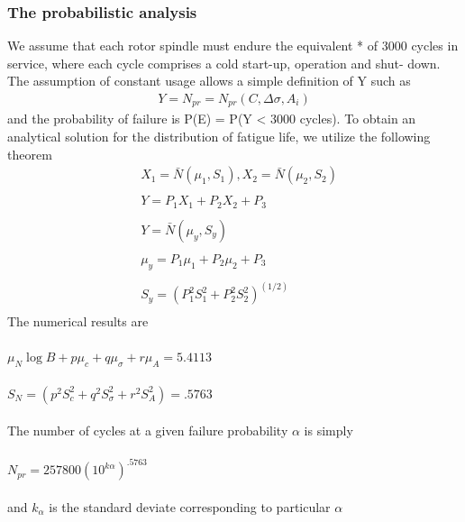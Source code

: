 \documentclass[12pt]{article}
\begin{document}
\subsubsection{The probabilistic analysis}
We assume that each rotor spindle must endure
the equivalent * of 3000 cycles in service, where each
cycle comprises a cold start-up, operation and shut-
down. The assumption of constant usage allows a
simple definition of Y such as
\begin{align*}
    Y = N_{pr} = N_{pr}(C, \Delta\sigma, A_i)
\end{align*}
and the probability of failure is P(E) = P(Y < 3000
cycles).
To obtain an analytical solution for the distribution of fatigue life, we utilize the following theorem
\begin{align*}
    &X_1 = \bar{N}(\mu_1, S_1),    X_2 = \bar{N}(\mu_2, S_2)\\
    \\&Y = P_1 X_1 + P_2 X_2 + P_3\\
    \\&Y = \bar{N}(\mu_y, S_y)\\
    \\&\mu_y = P_1 \mu_1 + P_2 \mu_2 + P_3\\
    \\&S_y = (P_1^2 S_1^2 + P_2^2 S_2^2)^{(1/2)}\\
\end{align*}
The numerical results are\\\\
$\mu_N \log B + p \mu_c + q \mu_\sigma + r\mu_A = 5.4113$\\\\
$S_N = (p^2 S_c^2 + q^2 S_\sigma^2 + r^2 S_A^2) = .5763$\\\\
The number of cycles at a given failure probability $\alpha$ is simply\\\\
$N_{pr} = 257800(10^{k \alpha})^{.5763}$\\\\
and $k_\alpha$ is the standard deviate corresponding to particular $\alpha$
\begin{figure}[H]
    \centering
    \captionsetup{labelformat=empty}  
\end{figure}
\end{document}
